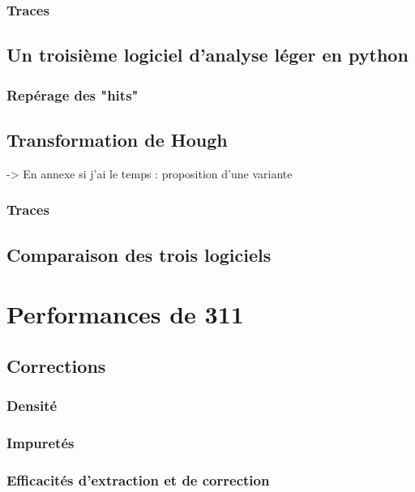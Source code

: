       \subsubsection{Traces}
    \subsection{Un troisième logiciel d'analyse léger en python}\label{sec::rawdatasoft}
      \subsubsection{Repérage des "hits"}
        \subsection{Transformation de Hough}
                -> En annexe si j'ai le temps : proposition d'une variante
      \subsubsection{Traces}
    \subsection{Comparaison des trois logiciels}
        
    \section{Performances de 311}
    \subsection{Corrections}
      \subsubsection{Densité}
      \subsubsection{Impuretés}
      \subsubsection{Efficacités d'extraction et de correction}
